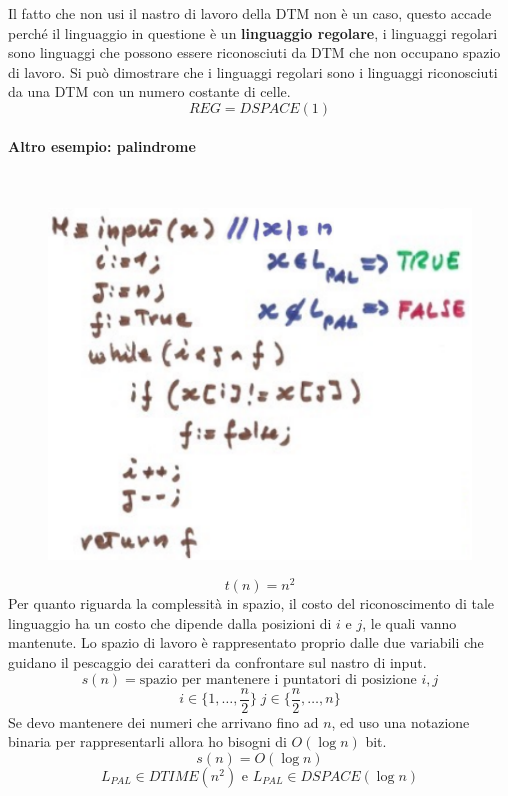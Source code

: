 \documentclass{article}
\begin{document}
Il fatto che non usi il nastro di lavoro della DTM non è un caso, questo accade
perché il linguaggio in questione è un \textbf{linguaggio regolare}, i linguaggi regolari sono
linguaggi che possono essere riconosciuti da DTM che non occupano spazio di lavoro. Si può
dimostrare che i linguaggi regolari sono i linguaggi riconosciuti da una DTM con
un numero costante di celle.
$$REG=DSPACE(1)$$
\paragraph{Altro esempio: palindrome}\mbox{}\\
\begin{figure}[H]
    \centering
    \includegraphics[scale=0.5]{images/DTM_pal.png}
\end{figure}
$$t(n)=n^2$$
Per quanto riguarda la complessità in spazio, il costo del riconoscimento di tale
linguaggio ha un costo che dipende dalla posizioni di $i$ e $j$, le quali vanno
mantenute. Lo spazio di lavoro è rappresentato proprio dalle due variabili
che guidano il pescaggio dei caratteri da confrontare sul nastro di input.
$$s(n)=\text{spazio per mantenere i puntatori di posizione }i,j$$
$$i\in\{1,\dots,\frac{n}{2}\}\;j\in\{\frac{n}{2},\dots,n\}$$
Se devo mantenere dei numeri che arrivano fino ad $n$, ed uso una notazione binaria
per rappresentarli allora ho bisogni di $O(\log n)$ bit.
$$s(n)=O(\log n)$$
$$L_{PAL}\in DTIME(n^2)\text{ e }L_{PAL}\in DSPACE(\log n)$$
\end{document}
